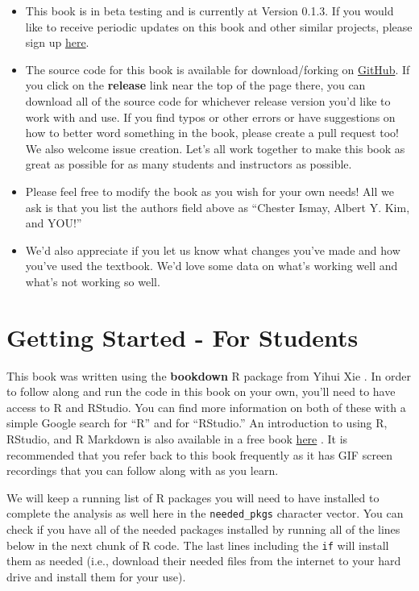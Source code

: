 \documentclass[]{tufte-book}
\providecommand{\tightlist}{%
  \setlength{\itemsep}{0pt}\setlength{\parskip}{0pt}}
\begin{document}
\begin{itemize}
\tightlist
\item
  This book is in beta testing and is currently at Version 0.1.3. If you
  would like to receive periodic updates on this book and other similar
  projects, please sign up \href{http://eepurl.com/cBkItf}{here}.
\item
  The source code for this book is available for download/forking on
  \href{https://github.com/ismayc/moderndiver-book}{GitHub}. If you
  click on the \textbf{release} link near the top of the page there, you
  can download all of the source code for whichever release version
  you'd like to work with and use. If you find typos or other errors or
  have suggestions on how to better word something in the book, please
  create a pull request too! We also welcome issue creation. Let's all
  work together to make this book as great as possible for as many
  students and instructors as possible.
\item
  Please feel free to modify the book as you wish for your own needs!
  All we ask is that you list the authors field above as ``Chester
  Ismay, Albert Y. Kim, and YOU!''
\item
  We'd also appreciate if you let us know what changes you've made and
  how you've used the textbook. We'd love some data on what's working
  well and what's not working so well.
\end{itemize}

\section{Getting Started - For
Students}\label{getting-started---for-students}

This book was written using the \textbf{bookdown} R package from Yihui
Xie \citep{R-bookdown}. In order to follow along and run the code in
this book on your own, you'll need to have access to R and RStudio. You
can find more information on both of these with a simple Google search
for ``R'' and for ``RStudio.'' An introduction to using R, RStudio, and
R Markdown is also available in a free book
\href{http://ismayc.github.io/rbasics-book}{here} \citep{usedtor2016}.
It is recommended that you refer back to this book frequently as it has
GIF screen recordings that you can follow along with as you learn.

We will keep a running list of R packages you will need to have
installed to complete the analysis as well here in the
\texttt{needed\_pkgs} character vector. You can check if you have all of
the needed packages installed by running all of the lines below in the
next chunk of R code. The last lines including the \texttt{if} will
install them as needed (i.e., download their needed files from the
internet to your hard drive and install them for your use).
\end{document}
